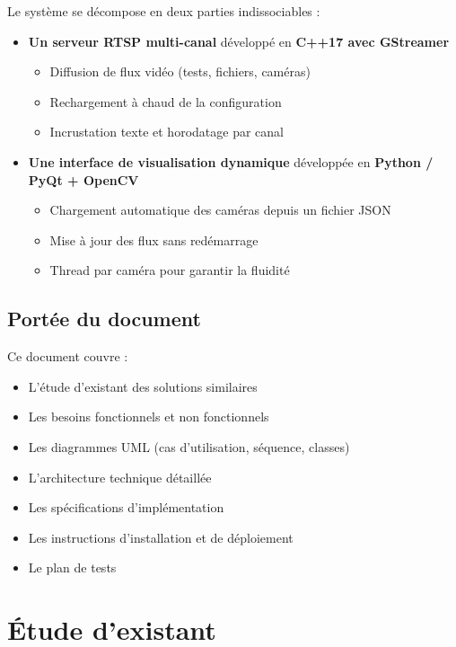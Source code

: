 \documentclass[12pt,a4paper]{report}
\begin{document}
Le système se décompose en deux parties indissociables :

\begin{itemize}
    \item \textbf{Un serveur RTSP multi-canal} développé en \textbf{C++17 avec GStreamer}
    \begin{itemize}
        \item Diffusion de flux vidéo (tests, fichiers, caméras)
        \item Rechargement à chaud de la configuration
        \item Incrustation texte et horodatage par canal
    \end{itemize}
    
    \item \textbf{Une interface de visualisation dynamique} développée en \textbf{Python / PyQt + OpenCV}
    \begin{itemize}
        \item Chargement automatique des caméras depuis un fichier JSON
        \item Mise à jour des flux sans redémarrage
        \item Thread par caméra pour garantir la fluidité
    \end{itemize}
\end{itemize}

\section{Portée du document}

Ce document couvre :
\begin{itemize}
    \item L'étude d'existant des solutions similaires
    \item Les besoins fonctionnels et non fonctionnels
    \item Les diagrammes UML (cas d'utilisation, séquence, classes)
    \item L'architecture technique détaillée
    \item Les spécifications d'implémentation
    \item Les instructions d'installation et de déploiement
    \item Le plan de tests
\end{itemize}

\chapter{Étude d'existant}
\end{document}
